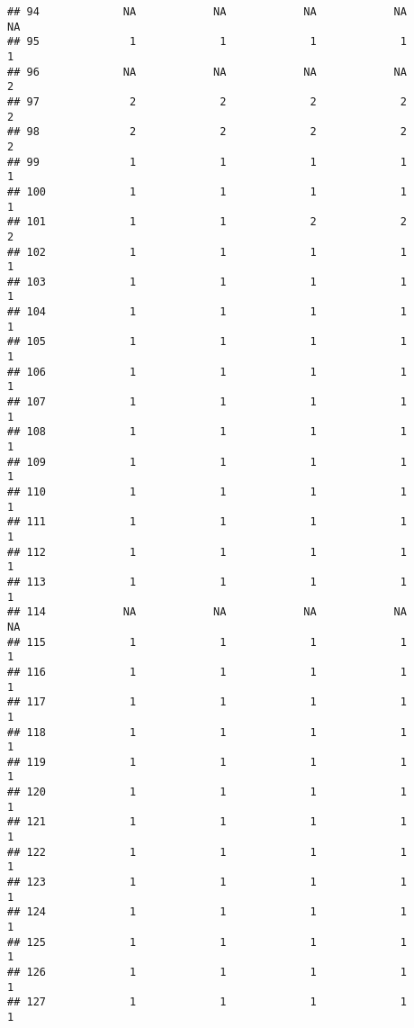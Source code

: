 \documentclass[
]{article}
\begin{document}
\begin{verbatim}
## 94             NA            NA            NA            NA            NA
## 95              1             1             1             1             1
## 96             NA            NA            NA            NA             2
## 97              2             2             2             2             2
## 98              2             2             2             2             2
## 99              1             1             1             1             1
## 100             1             1             1             1             1
## 101             1             1             2             2             2
## 102             1             1             1             1             1
## 103             1             1             1             1             1
## 104             1             1             1             1             1
## 105             1             1             1             1             1
## 106             1             1             1             1             1
## 107             1             1             1             1             1
## 108             1             1             1             1             1
## 109             1             1             1             1             1
## 110             1             1             1             1             1
## 111             1             1             1             1             1
## 112             1             1             1             1             1
## 113             1             1             1             1             1
## 114            NA            NA            NA            NA            NA
## 115             1             1             1             1             1
## 116             1             1             1             1             1
## 117             1             1             1             1             1
## 118             1             1             1             1             1
## 119             1             1             1             1             1
## 120             1             1             1             1             1
## 121             1             1             1             1             1
## 122             1             1             1             1             1
## 123             1             1             1             1             1
## 124             1             1             1             1             1
## 125             1             1             1             1             1
## 126             1             1             1             1             1
## 127             1             1             1             1             1

\end{verbatim}
\end{document}
